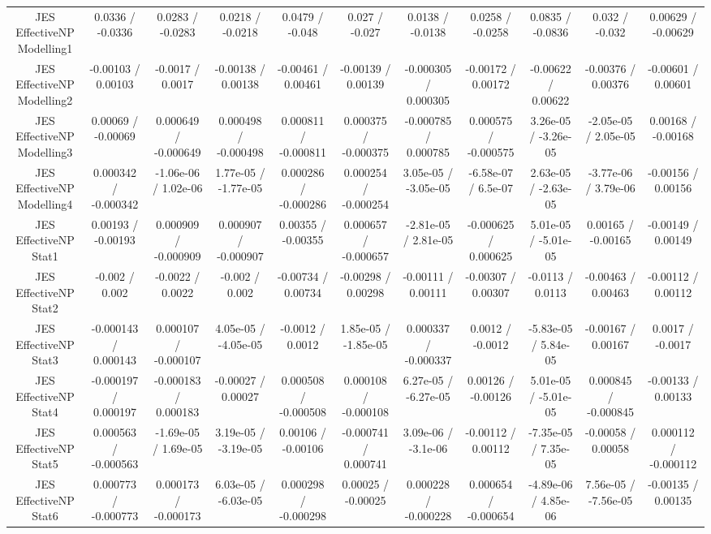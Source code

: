 \begin{table}[htbp]
\begin{center}
\begin{tabular}{|c|c|c|c|c|c|c|c|c|c|c|}
  JES EffectiveNP Modelling1 & 0.0336 / -0.0336 & 0.0283 / -0.0283 & 0.0218 / -0.0218 & 0.0479 / -0.048 & 0.027 / -0.027 & 0.0138 / -0.0138 & 0.0258 / -0.0258 & 0.0835 / -0.0836 & 0.032 / -0.032 & 0.00629 / -0.00629 \\ 
  JES EffectiveNP Modelling2 & -0.00103 / 0.00103 & -0.0017 / 0.0017 & -0.00138 / 0.00138 & -0.00461 / 0.00461 & -0.00139 / 0.00139 & -0.000305 / 0.000305 & -0.00172 / 0.00172 & -0.00622 / 0.00622 & -0.00376 / 0.00376 & -0.00601 / 0.00601 \\ 
  JES EffectiveNP Modelling3 & 0.00069 / -0.00069 & 0.000649 / -0.000649 & 0.000498 / -0.000498 & 0.000811 / -0.000811 & 0.000375 / -0.000375 & -0.000785 / 0.000785 & 0.000575 / -0.000575 & 3.26e-05 / -3.26e-05 & -2.05e-05 / 2.05e-05 & 0.00168 / -0.00168 \\ 
  JES EffectiveNP Modelling4 & 0.000342 / -0.000342 & -1.06e-06 / 1.02e-06 & 1.77e-05 / -1.77e-05 & 0.000286 / -0.000286 & 0.000254 / -0.000254 & 3.05e-05 / -3.05e-05 & -6.58e-07 / 6.5e-07 & 2.63e-05 / -2.63e-05 & -3.77e-06 / 3.79e-06 & -0.00156 / 0.00156 \\ 
  JES EffectiveNP Stat1 & 0.00193 / -0.00193 & 0.000909 / -0.000909 & 0.000907 / -0.000907 & 0.00355 / -0.00355 & 0.000657 / -0.000657 & -2.81e-05 / 2.81e-05 & -0.000625 / 0.000625 & 5.01e-05 / -5.01e-05 & 0.00165 / -0.00165 & -0.00149 / 0.00149 \\ 
  JES EffectiveNP Stat2 & -0.002 / 0.002 & -0.0022 / 0.0022 & -0.002 / 0.002 & -0.00734 / 0.00734 & -0.00298 / 0.00298 & -0.00111 / 0.00111 & -0.00307 / 0.00307 & -0.0113 / 0.0113 & -0.00463 / 0.00463 & -0.00112 / 0.00112 \\ 
  JES EffectiveNP Stat3 & -0.000143 / 0.000143 & 0.000107 / -0.000107 & 4.05e-05 / -4.05e-05 & -0.0012 / 0.0012 & 1.85e-05 / -1.85e-05 & 0.000337 / -0.000337 & 0.0012 / -0.0012 & -5.83e-05 / 5.84e-05 & -0.00167 / 0.00167 & 0.0017 / -0.0017 \\ 
  JES EffectiveNP Stat4 & -0.000197 / 0.000197 & -0.000183 / 0.000183 & -0.00027 / 0.00027 & 0.000508 / -0.000508 & 0.000108 / -0.000108 & 6.27e-05 / -6.27e-05 & 0.00126 / -0.00126 & 5.01e-05 / -5.01e-05 & 0.000845 / -0.000845 & -0.00133 / 0.00133 \\ 
  JES EffectiveNP Stat5 & 0.000563 / -0.000563 & -1.69e-05 / 1.69e-05 & 3.19e-05 / -3.19e-05 & 0.00106 / -0.00106 & -0.000741 / 0.000741 & 3.09e-06 / -3.1e-06 & -0.00112 / 0.00112 & -7.35e-05 / 7.35e-05 & -0.00058 / 0.00058 & 0.000112 / -0.000112 \\ 
  JES EffectiveNP Stat6 & 0.000773 / -0.000773 & 0.000173 / -0.000173 & 6.03e-05 / -6.03e-05 & 0.000298 / -0.000298 & 0.00025 / -0.00025 & 0.000228 / -0.000228 & 0.000654 / -0.000654 & -4.89e-06 / 4.85e-06 & 7.56e-05 / -7.56e-05 & -0.00135 / 0.00135 \\ 

\end{tabular}
\end{center}
\end{table}
